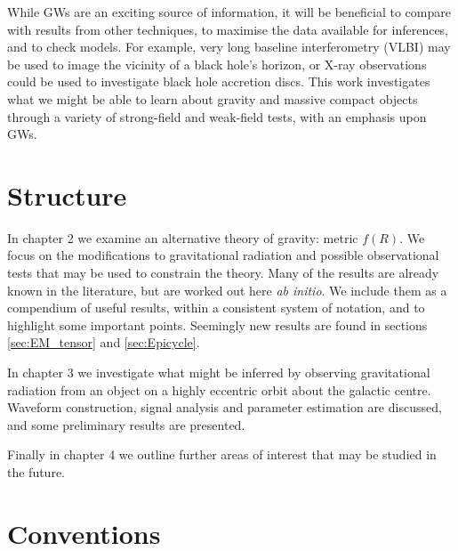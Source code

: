 While GWs are an exciting source of information, it will be beneficial to compare with results from other techniques, to maximise the data available for inferences, and to check models. For example, very long baseline interferometry (VLBI) may be used to image the vicinity of a black hole's horizon, or X-ray observations could be used to investigate black hole accretion discs. This work investigates what we might be able to learn about gravity and massive compact objects through a variety of strong-field and weak-field tests, with an emphasis upon GWs.

\section{Structure}

In chapter 2 we examine an alternative theory of gravity: metric $f(R)$. We focus on the modifications to gravitational radiation and possible observational tests that may be used to constrain the theory. Many of the results are already known in the literature, but are worked out here {\it ab initio}. We include them as a compendium of useful results, within a consistent system of notation, and to highlight some important points. Seemingly new results are found in sections \ref{sec:EM_tensor} and \ref{sec:Epicycle}.

In chapter 3 we investigate what might be inferred by observing gravitational radiation from an object on a highly eccentric orbit about the galactic centre. Waveform construction, signal analysis and parameter estimation are discussed, and some preliminary results are presented.

Finally in chapter 4 we outline further areas of interest that may be studied in the future.

\section{Conventions}

